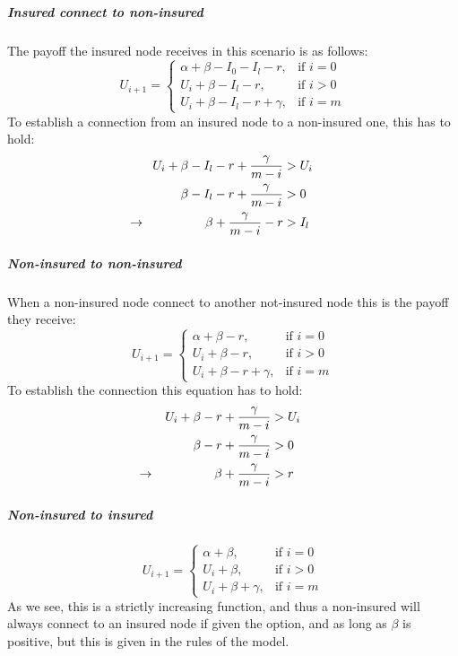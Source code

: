 \subparagraph{Insured connect to non-insured}
The payoff the insured node receives in this scenario is as follows:
\begin{equation}
    U_{i+1}= 
\begin{cases}
    \alpha + \beta - I_{0} - I_{l} -r,& \text{if } i = 0\\
    U_{i}+\beta -I_{l}-r,& \text{if }  i>0\\
    U_{i}+\beta -I_{l}-r+\gamma,& \text{if } i=m
\end{cases}
\label{eq:itonoti}
\end{equation}
To establish a connection from an insured node to a non-insured one, this has to hold:
\begin{eqnarray}
U_{i}+\beta-I_{l}-r+\frac{\gamma}{m-i}&>U_{i} \nonumber \\ 
\beta-I_{l}-r+\frac{\gamma}{m-i}&>0 \nonumber \\ 
\llap{$\rightarrow$\hspace{50pt}} \beta+\frac{\gamma}{m-i}-r&>I_{l} 
\end{eqnarray}
\subparagraph{Non-insured to non-insured}
When a non-insured node connect to another not-insured node this is the payoff they receive:
\begin{equation}
    U_{i+1}= 
\begin{cases}
    \alpha + \beta -r,& \text{if } i = 0\\
    U_{i}+\beta -r,& \text{if }  i>0\\
    U_{i}+\beta -r +\gamma,& \text{if } i=m
\end{cases}
\label{eq:noitonoti}
\end{equation}
To establish the connection this equation has to hold:
\begin{eqnarray}
U_{i}+\beta-r+\frac{\gamma}{m-i}&>U_{i} \nonumber \\ 
\beta-r+\frac{\gamma}{m-i}&>0 \nonumber \\ 
\llap{$\rightarrow$\hspace{50pt}} \beta+\frac{\gamma}{m-i}&>r
\end{eqnarray}
\subparagraph{Non-insured to insured}
\begin{equation}
    U_{i+1}= 
\begin{cases}
    \alpha + \beta,& \text{if } i = 0\\
    U_{i}+\beta,& \text{if }  i>0\\
    U_{i}+\beta +\gamma,& \text{if } i=m
\end{cases}
\label{eq:noitoti}
\end{equation}
As we see, this is a strictly increasing function, and thus a non-insured will always connect to an insured node if given the option, and as long as $\beta$ is positive, but this is given in the rules of the model.

